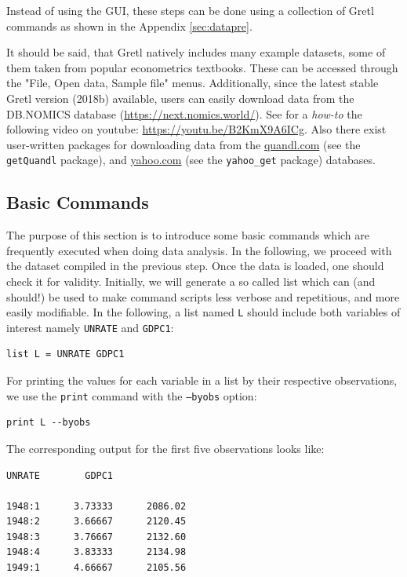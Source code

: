 \documentclass[11pt]{article}
\begin{document}
Instead of using the GUI, these steps can be done using a collection of Gretl commands as shown in the Appendix \ref{sec:datapre}.

It should be said, that Gretl natively includes many example datasets, some of them taken from popular econometrics textbooks. These can be accessed through the "File, Open data, Sample file" menus. Additionally, since the latest stable Gretl version (2018b) available, users can easily download data from the DB.NOMICS database (\url{https://next.nomics.world/}). See for a \textit{how-to} the following video on youtube: \url{https://youtu.be/B2KmX9A6ICg}. Also there exist user-written packages for downloading data from the \url{quandl.com} (see the \texttt{getQuandl} package), and \url{yahoo.com} (see the \texttt{yahoo\_get} package) databases.


\subsection{Basic Commands}
The purpose of this section is to introduce some basic commands which are frequently executed when doing data analysis. In the following, we proceed with the dataset compiled in the previous step. Once the data is loaded, one should check it for validity. %
Initially, we will generate a so called list which can (and should!) be used to make command scripts less verbose and repetitious, and more easily modifiable. In the following, a list named \texttt{L} should include both variables of interest namely \texttt{UNRATE} and \texttt{GDPC1}:
\begin{verbatim}
list L = UNRATE GDPC1
\end{verbatim}

For printing the values for each variable in a list by their respective observations, we use the \texttt{print} command with the \texttt{---byobs} option:
\begin{verbatim}
print L --byobs
\end{verbatim}
The corresponding output for the first five observations looks like:
\begin{Verbatim}[baselinestretch=0.75]
             UNRATE        GDPC1

1948:1      3.73333      2086.02
1948:2      3.66667      2120.45
1948:3      3.76667      2132.60
1948:4      3.83333      2134.98
1949:1      4.66667      2105.56
\end{Verbatim}
\end{document}
